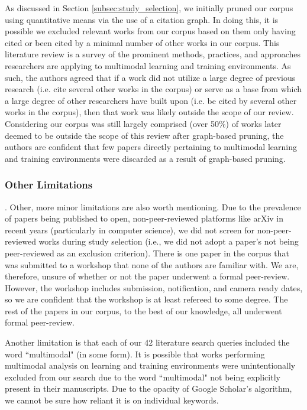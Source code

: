 \documentclass[manuscript,screen,review]{acmart}
\begin{document}
As discussed in Section \ref{subsec:study_selection}, we initially pruned our corpus using quantitative means via the use of a citation graph. In doing this, it is possible we excluded relevant works from our corpus based on them only having cited or been cited by a minimal number of other works in our corpus. This literature review is a survey of the prominent methods, practices, and approaches researchers are applying to multimodal learning and training environments. As such, the authors agreed that if a work did not utilize a large degree of previous research (i.e. cite several other works in the corpus) or serve as a base from which a large degree of other researchers have built upon (i.e. be cited by several other works in the corpus), then that work was likely outside the scope of our review. Considering our corpus was still largely comprised (over 50\%) of works later deemed to be outside the scope of this review after graph-based pruning, the authors are confident that few papers directly pertaining to multimodal learning and training environments were discarded as a result of graph-based pruning.

\subsubsection{Other Limitations}.
Other, more minor limitations are also worth mentioning. Due to the prevalence of papers being published to open, non-peer-reviewed platforms like arXiv in recent years (particularly in computer science), we did not screen for non-peer-reviewed works during study selection (i.e., we did not adopt a paper's not being peer-reviewed as an exclusion criterion). There is one paper in the corpus that was submitted to a workshop that none of the authors are familiar with. We are, therefore, unsure of whether or not the paper underwent a formal peer-review. However, the workshop includes submission, notification, and camera ready dates, so we are confident that the workshop is at least refereed to some degree. The rest of the papers in our corpus, to the best of our knowledge, all underwent formal peer-review.

Another limitation is that each of our 42 literature search queries included the word ``multimodal" (in some form). It is possible that works performing multimodal analysis on learning and training environments were unintentionally excluded from our search due to the word ``multimodal" not being explicitly present in their manuscripts. Due to the opacity of Google Scholar's algorithm, we cannot be sure how reliant it is on individual keywords. 
\end{document}
